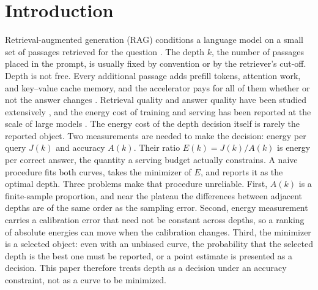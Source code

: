 \documentclass[a4paper,fleqn]{cas-sc}
\begin{document}
\begingroup
\hfuzz=120pt
\maketitle
\endgroup
{}
\linenumbers

\section{Introduction}\label{sec:intro}

Retrieval-augmented generation (RAG) conditions a language model on a small set of passages retrieved for the question \cite{lewis2020rag}. The depth $k$, the number of passages placed in the prompt, is usually fixed by convention or by the retriever's cut-off. Depth is not free. Every additional passage adds prefill tokens, attention work, and key--value cache memory, and the accelerator pays for all of them whether or not the answer changes \cite{kwon2023pagedattention}. Retrieval quality and answer quality have been studied extensively \cite{karpukhin2020dpr,liu2023lost}, and the energy cost of training and serving has been reported at the scale of large models \cite{strubell2019,henderson2020,patterson2021,dodge2022}. The energy cost of the depth decision itself is rarely the reported object. Two measurements are needed to make the decision: energy per query $J(k)$ and accuracy $A(k)$. Their ratio $E(k)=J(k)/A(k)$ is energy per correct answer, the quantity a serving budget actually constrains. A naive procedure fits both curves, takes the minimizer of $E$, and reports it as the optimal depth. Three problems make that procedure unreliable. First, $A(k)$ is a finite-sample proportion, and near the plateau the differences between adjacent depths are of the same order as the sampling error. Second, energy measurement carries a calibration error that need not be constant across depths, so a ranking of absolute energies can move when the calibration changes. Third, the minimizer is a selected object: even with an unbiased curve, the probability that the selected depth is the best one must be reported, or a point estimate is presented as a decision. This paper therefore treats depth as a decision under an accuracy constraint, not as a curve to be minimized.
\end{document}
